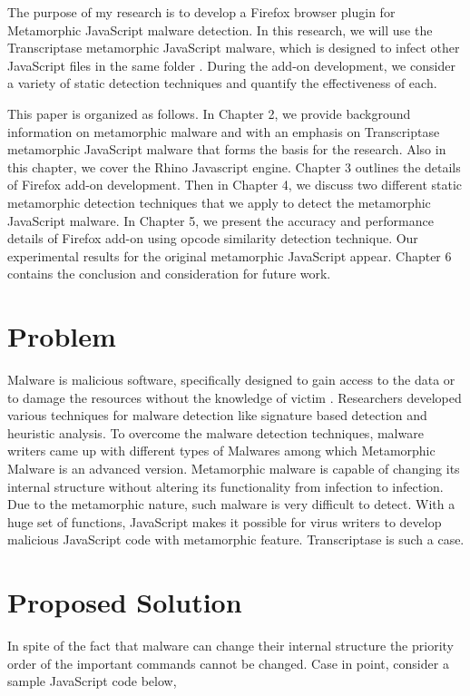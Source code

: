 The purpose of my research is to develop a Firefox browser plugin for Metamorphic JavaScript malware detection. In this research, we will use the Transcriptase metamorphic JavaScript malware, which is designed to infect other JavaScript files in the same folder \cite{bib5}. During the add-on development, we consider a variety of static detection techniques and quantify the effectiveness of each. 

This paper is organized as follows. In Chapter 2, we provide background information on metamorphic malware and with an emphasis on Transcriptase metamorphic JavaScript malware that forms the basis for the research. Also in this chapter, we cover the Rhino Javascript engine. Chapter 3 outlines the details of Firefox add-on development. Then in Chapter 4, we discuss two different static metamorphic detection techniques that we apply to detect the metamorphic JavaScript malware. In Chapter 5, we present the accuracy and performance details of Firefox add-on using opcode similarity detection technique. Our experimental results for the original metamorphic JavaScript appear. Chapter 6 contains the conclusion and consideration for future work.

\section{Problem} 

Malware is malicious software, specifically designed to gain access to the data or to damage the resources without the knowledge of victim \cite{bib4}. Researchers developed various techniques for malware detection like signature based detection and heuristic analysis. To overcome the malware detection techniques, malware writers came up with different types of Malwares among which Metamorphic Malware is an advanced version. Metamorphic malware is capable of changing its internal structure without altering its functionality from infection to infection. Due to the metamorphic nature, such malware is very difficult to detect. With a huge set of functions, JavaScript makes it possible for virus writers to develop malicious JavaScript code with metamorphic feature. Transcriptase is such a case.

\section{Proposed Solution}

In spite of the fact that malware can change their internal structure the priority order of the important commands cannot be changed. Case in point, consider a sample JavaScript code below,

